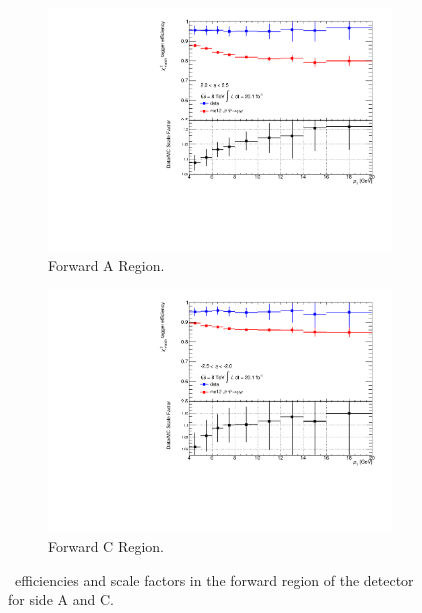 \begin{figure}[htbp]
  \centering
  \begin{subfigure}[b]{0.85\textwidth}
    \includegraphics[width=\textwidth]{PartCalibration2012/Plots/SFPlots/Forward_A_smt.pdf}
    \caption{Forward A Region.} \label{fig:CalibrationScaleFactorForwardA}
  \end{subfigure}
  
  \begin{subfigure}[b]{0.85\textwidth}
    \includegraphics[width=\textwidth]{PartCalibration2012/Plots/SFPlots/Forward_C_smt.pdf}
    \caption{Forward C Region.} \label{fig:CalibrationScaleFactorForwardC}
  \end{subfigure}
  \caption[\xsm\ efficiencies and scale factors in the forward region of the detector for side A and C.]{\xsm\ efficiencies and scale factors in the forward region of the detector for side  A and  C.} \label{fig:CalibrationScaleFactorForward}
\end{figure}

